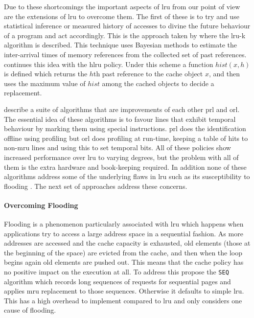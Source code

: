 Due to these shortcomings the important aspects of \gls{lru} from our point of view are the extensions of \gls{lru} to overcome them. The first of these is to try and use statistical inference or measured history of accesses to divine the future behaviour of a program and act accordingly. This is the approach taken by \citet{oneilLRUKPageReplacement1993} where the \gls{lru-k} algorithm is described. This technique uses Bayesian methods to estimate the inter-arrival times of memory references from the collected set of past references. \citet{vakaliLRUbasedAlgorithmsWeb2000} continues this idea with the \gls{hlru} policy. Under this scheme a function $hist(x,h)$ is defined which returns the $h$th past reference to the cache object $x$, and then uses the maximum value of $hist$ among the cached objects to decide a replacement.

\citet{wongModifiedLRUPolicies2000} describe a suite of algorithms that are improvements of each other \gls{prl} and \gls{orl}. The essential idea of these algorithms is to favour lines that exhibit temporal behaviour by marking them using special instructions. \gls{prl} does the identification offline using profiling but \gls{orl} does profiling at run-time, keeping a table of hits to non-\gls{mru} lines and using this to set temporal bits. All of these policies show increased performance over \gls{lru} to varying degrees, but the problem with all of them is the extra hardware and book-keeping required. In addition none of these algorithms address some of the underlying flaws in \gls{lru} such as its susceptibility to flooding \cite{glassAdaptivePageReplacement1997}. The next set of approaches address these concerns.

\paragraph{Overcoming Flooding}


Flooding is a phenomenon particularly associated with \gls{lru} which happens when applications try to access a large address space in a sequential fashion. As more addresses are accessed and the cache capacity is exhausted, old elements (those at the beginning of the space) are evicted from the cache, and then when the loop begins again old elements are pushed out. This means that the cache policy has no positive impact on the execution at all. To address this \citet{glassAdaptivePageReplacement1997} propose the \texttt{SEQ} algorithm which records long sequences of requests for sequential pages and applies \gls{mru} replacement to those sequences. Otherwise it defaults to simple \gls{lru}. This has a high overhead to implement compared to \gls{lru} and only considers one cause of flooding. 

